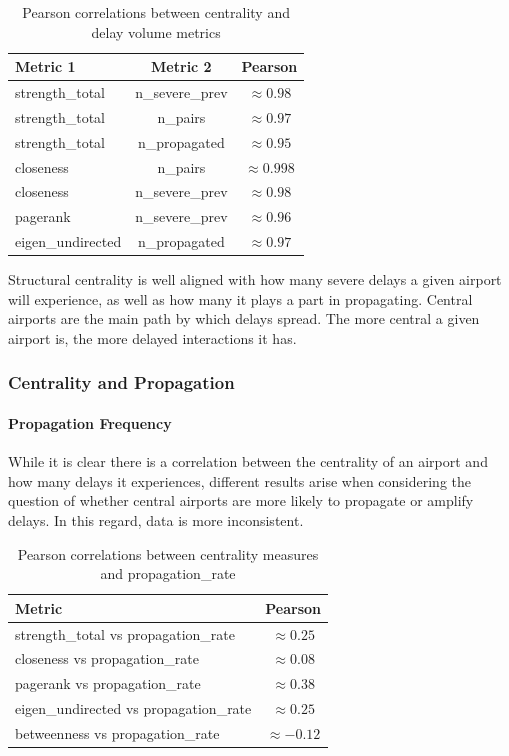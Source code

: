 \documentclass[10pt]{article}
\begin{document}
\begin{table}[h!]
    \centering 
    \caption{Pearson correlations between centrality and delay volume metrics}
    \begin{tabular}{lcc}
        \toprule
        Metric 1 & Metric 2 & Pearson \\
        \midrule
        strength\_total & n\_severe\_prev & $\approx 0.98$ \\
        strength\_total & n\_pairs        & $\approx 0.97$ \\
        strength\_total & n\_propagated   & $\approx 0.95$ \\
        closeness       & n\_pairs        & $\approx 0.998$ \\
        closeness       & n\_severe\_prev & $\approx 0.98$ \\
        pagerank        & n\_severe\_prev & $\approx 0.96$ \\
        eigen\_undirected & n\_propagated & $\approx 0.97$ \\
        \bottomrule
    \end{tabular}
\end{table}

Structural centrality is well aligned with how many severe delays a given airport will experience, as well as how many it plays a part in propagating. Central airports are the main path by which delays spread. The more central a given airport is, the more delayed interactions it has.

\subsubsection{Centrality and Propagation}

\paragraph{Propagation Frequency}
While it is clear there is a correlation between the centrality of an airport and how many delays it experiences, different results arise when considering the question of whether central airports are more likely to propagate or amplify delays. In this regard, data is more inconsistent.

\begin{table}[h!]
    \centering
    \caption{Pearson correlations between centrality measures and propagation\_rate}
    \begin{tabular}{l c}
        \toprule
        Metric & Pearson \\
        \midrule
        strength\_total vs propagation\_rate   & $\approx 0.25$ \\
        closeness vs propagation\_rate         & $\approx 0.08$ \\
        pagerank vs propagation\_rate          & $\approx 0.38$ \\
        eigen\_undirected vs propagation\_rate & $\approx 0.25$ \\
        betweenness vs propagation\_rate       & $\approx -0.12$ \\
        \bottomrule
    \end{tabular}
\end{table}
\end{document}
